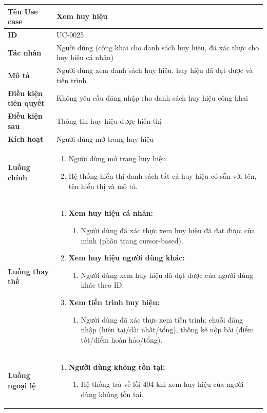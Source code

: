 {
\renewcommand{\arraystretch}{1.5}

\begin{tabularx}{\textwidth}{|>{\raggedright\arraybackslash}X|>{\raggedright\arraybackslash}X|}
\hline
\textbf{Tên Use case} & Xem huy hiệu \\
\hline
\textbf{ID} & UC-0025 \\
\hline
\textbf{Tác nhân} & Người dùng (công khai cho danh sách huy hiệu, đã xác thực cho huy hiệu cá nhân) \\
\hline
\textbf{Mô tả} & Người dùng xem danh sách huy hiệu, huy hiệu đã đạt được và tiến trình \\
\hline
\textbf{Điều kiện tiên quyết} & Không yêu cầu đăng nhập cho danh sách huy hiệu công khai \\
\hline
\textbf{Điều kiện sau} & Thông tin huy hiệu được hiển thị \\
\hline
\textbf{Kích hoạt} & Người dùng mở trang huy hiệu \\
\hline
\textbf{Luồng chính} &
\begin{enumerate}
    \item Người dùng mở trang huy hiệu.
    \item Hệ thống hiển thị danh sách tất cả huy hiệu có sẵn với tên, tên hiển thị và mô tả.
\end{enumerate} \\
\hline
\textbf{Luồng thay thế} &
\begin{enumerate}
    \item \textbf{Xem huy hiệu cá nhân:}
    \begin{enumerate}
        \item[1A.] Người dùng đã xác thực xem huy hiệu đã đạt được của mình (phân trang cursor-based).
    \end{enumerate}
    \item \textbf{Xem huy hiệu người dùng khác:}
    \begin{enumerate}
        \item[1B.] Người dùng xem huy hiệu đã đạt được của người dùng khác theo ID.
    \end{enumerate}
    \item \textbf{Xem tiến trình huy hiệu:}
    \begin{enumerate}
        \item[1C.] Người dùng đã xác thực xem tiến trình: chuỗi đăng nhập (hiện tại/dài nhất/tổng), thống kê nộp bài (điểm tốt/điểm hoàn hảo/tổng).
    \end{enumerate}
\end{enumerate} \\
\hline
\textbf{Luồng ngoại lệ} &
\begin{enumerate}
    \item \textbf{Người dùng không tồn tại:}
    \begin{enumerate}
        \item[1BErr.] Hệ thống trả về lỗi 404 khi xem huy hiệu của người dùng không tồn tại.
    \end{enumerate}
\end{enumerate} \\
\hline
\end{tabularx}
}
